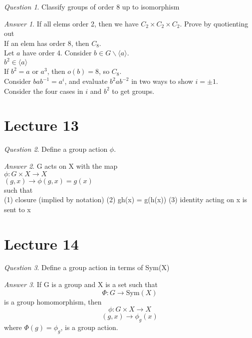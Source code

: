 \documentclass[]{article}
\theoremstyle{remark}
\theoremstyle{qnstyle}
\newtheorem{question}{Question}
\theoremstyle{answerstyle}
\newtheorem*{answer}{Answer}
\begin{document}
\begin{question}
    Classify groups of order 8 up to isomorphism
\end{question}
\begin{answer}
    If all elems order 2, then we have $C_2 \times C_2 \times C_2$. Prove by quotienting out\\
    If an elem has order 8, then $C_8$.\\
    Let $a$ have order 4. Consider $b \in G \backslash \langle a \rangle$.\\
    $b^2 \in \langle a \rangle$\\
    If $b^2 = a$ or $a^3$, then $o(b) = 8$, so $C_8$.\\
    Consider $bab^{-1} = a^{i}$, and evaluate $b^2 a b^{-2}$ in two ways to show $i = \pm 1$.\\
    Consider the four cases in $i$ and $b^2$ to get groups.
\end{answer}








\section*{Lecture 13}

\begin{question}
    Define a group action $\phi$.
\end{question}
\begin{answer}
    G acts on X with the map\\
    $\phi: G \times X \to X$\\
    $(g, x) \to \phi(g,x) = g(x)$ \\
    such that \\
    (1) closure (implied by notation)
    (2) gh(x) = g(h(x))
    (3) identity acting on x is sent to x
\end{answer}

\section*{Lecture 14}

\begin{question}
    Define a group action in terms of Sym(X)
\end{question}
\begin{answer}
    If G is a group and X is a set such that $$\Phi: G \to \text{Sym}(X)$$ 
    is a group homomorphism, then
    $$\phi: G \times X \to X$$
    $$(g, x) \to \phi_g(x)$$
    where $\Phi(g) = \phi_g$, is a group action.
\end{answer}
\end{document}
